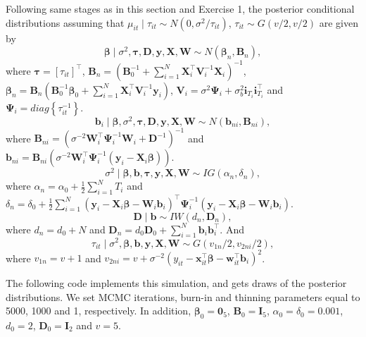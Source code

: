 Following same stages as in this section and Exercise 1, the posterior conditional distributions assuming that $\mu_{it}\mid \tau_{it}\sim N(0, \sigma^2/\tau_{it})$, $\tau_{it}\sim G(v/2,v/2)$ are given by 
\begin{equation*}
	\bm{\beta}\mid \sigma^2,\bm{\tau},\bm{D},\bm{y}, \bm{X}, \bm{W} \sim {N}(\bm{\beta}_n,\bm{B}_n), 
\end{equation*}
where $\bm{\tau}=[\tau_{it}]^{\top}$, $\bm{B}_n = (\bm{B}_0^{-1} +\sum_{i=1}^N \bm{X}_i^{\top}\bm{V}_i^{-1}\bm{X}_i)^{-1}$, $\bm{\beta}_n= \bm{B}_n(\bm{B}_0^{-1}\bm{\beta}_0 + \sum_{i=1}^N\bm{X}_i^{\top}\bm{V}_i^{-1}\bm{y}_i)$, $\bm{V}_i=\sigma^2\bm{\Psi}_i+\sigma_{b}^2\bm{i}_{T_i}\bm{i}_{T_i}^{\top}$ and $\bm{\Psi}_i=diag\left\{\tau_{it}^{-1}\right\}$.
\begin{equation*}
	\bm{b}_i\mid \bm{\beta},\sigma^2,\bm{\tau},\bm{D},\bm{y}, \bm{X}, \bm{W} \sim {N}(\bm{b}_{ni},\bm{B}_{ni}), 
\end{equation*} 
where $\bm{B}_{ni}=(\sigma^{-2}\bm{W}_i^{\top}\bm{\Psi}_i^{-1}\bm{W}_i+\bm{D}^{-1})^{-1}$ and $\bm{b}_{ni}=\bm{B}_{ni}(\sigma^{-2}\bm{W}_i^{\top}\bm{\Psi}_i^{-1}(\bm{y}_i-\bm{X}_i\bm{\beta}))$.
\begin{equation*}
	\sigma^2\mid  \bm{\beta}, \bm{b}, \bm{\tau}, \bm{y}, \bm{X}, \bm{W} \sim {I}{G}(\alpha_n, \delta_n),
\end{equation*}
where $\alpha_n=\alpha_0+\frac{1}{2}\sum_{i=1}^N T_i$ and $\delta_n=\delta_0+\frac{1}{2}\sum_{i=1}^N(\bm{y}_i-\bm{X}_i\bm{\beta}-\bm{W}_i\bm{b}_i)^{\top}\bm{\Psi}_i^{-1}(\bm{y}_i-\bm{X}_i\bm{\beta}-\bm{W}_i\bm{b}_i)$.  
\begin{equation*}
	\bm{D}\mid  \bm{b} \sim {I}{W}(d_n, \bm{D}_n),
\end{equation*}
where $d_n=d_0+N$ and $\bm{D}_n=d_0\bm{D}_0+\sum_{i=1}^N\bm{b}_i\bm{b}_i^{\top}$. And
\begin{equation*}
	\tau_{it}\mid \sigma^2, \bm{\beta}, \bm{b}, \bm{y}, \bm{X}, \bm{W} \sim {G}(v_{1n}/2, v_{2ni}/2),
\end{equation*}
where $v_{1n}=v+1$ and $v_{2ni}=v+\sigma^{-2}(y_{it}-\bm{x}_{it}^{\top}\bm{\beta}-\bm{w}_{it}^{\top}\bm{b}_i)^2$.

The following code implements this simulation, and gets draws of the posterior distributions. We set MCMC iterations, burn-in and thinning parameters equal to 5000, 1000 and 1, respectively. In addition, $\bm{\beta}_0=\bm{0}_5$, $\bm{B}_0=\bm{I}_5$, $\alpha_0=\delta_0=0.001$, $d_0=2$, $\bm{D}_0=\bm{I}_2$ and $v=5$.

